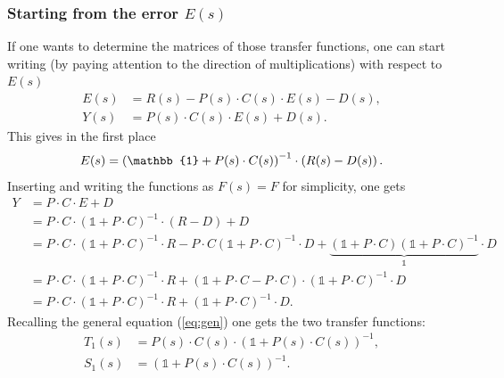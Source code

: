 \documentclass[a4paper,12 pt]{article}
\numberwithin{equation}{section}
\theoremstyle{definition}
\theoremstyle{remark}
\theoremstyle{definition}
\theoremstyle{definition}
\theoremstyle{definition}
\theoremstyle{remark}
\begin{document}
\subsubsection*{Starting from the error $E(s)$} If one wants to determine the matrices of those transfer functions, one can start writing (by paying attention to the direction of multiplications) with respect to $E(s)$
\begin{equation}
\begin{split}
E(s)&=R(s)-P(s)\cdot C(s) \cdot E(s)-D(s),\\
Y(s)&=P(s)\cdot C(s)\cdot E(s)+D(s).
\end{split}
\end{equation}
This gives in the first place
\begin{equation}
E(s)=\left( \mathbb{1}+ P(s)\cdot C(s) \right)^{-1}\cdot \left(R(s)-D(s)\right).\\
\end{equation}
Inserting and writing the functions as $F(s)=F$ for simplicity, one gets
\begin{equation}
\begin{split}
Y&=P \cdot C\cdot E+ D\\
&=P\cdot C \cdot  \left( \mathbb{1}+P\cdot C\right) ^{-1}\cdot \left( R-D\right) +D\\
&=P\cdot C\cdot \left( \mathbb{1}+P\cdot C\right) ^{-1} \cdot R -P\cdot C  \left( \mathbb{1}+P\cdot C\right) ^{-1} \cdot D + \underbrace{\left( \mathbb{1}+P\cdot C\right)  \left( \mathbb{1}+P\cdot C \right) ^{-1}}_{\mathbb{1}}\cdot D\\
&=P\cdot C\cdot \left( \mathbb{1}+P\cdot C\right) ^{-1} \cdot R + \left( \mathbb{1}+P\cdot C - P\cdot C \right)\cdot \left( \mathbb{1} + P\cdot C\right)^{-1} \cdot D\\
&= P\cdot C\cdot \left( \mathbb{1}+P\cdot C\right) ^{-1} \cdot R + \left( \mathbb{1} + P\cdot C\right)^{-1} \cdot D.
\end{split}
\end{equation}
Recalling the general equation (\ref{eq:gen}) one gets the two transfer functions:
\begin{equation}
\begin{split}
T_1(s)&=P(s)\cdot C(s)\cdot \left( \mathbb{1}+P(s)\cdot C(s)\right)^{-1},\\
S_1(s)&=\left(\mathbb{1}+P(s)\cdot C(s) \right)^{-1}.
\end{split}
\end{equation}
\end{document}
